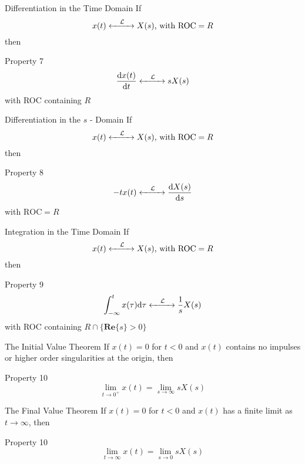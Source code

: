 \documentclass[aspectratio=169]{beamer}
\begin{document}
\begin{frame}{Differentiation in the Time Domain}
If\\
\[x(t) \xleftrightarrow[]{\quad\mathcal{L}\quad} X(s) \text{, with } \mathrm{ROC} =R\]
then
\begin{block}{Property 7}
	\[ \frac{\mathrm{d}x(t)}{\mathrm{d}t} \xleftrightarrow[]{\quad\mathcal{L}\quad} sX(s) \]
	\centering
	with ROC containing $ R $
\end{block}
\end{frame}

\begin{frame}{Differentiation in the $ s $ - Domain}
If\\
\[x(t) \xleftrightarrow[]{\quad\mathcal{L}\quad} X(s) \text{, with } \mathrm{ROC} =R\]
then
\begin{block}{Property 8}
	\[ -tx(t) \xleftrightarrow[]{\quad\mathcal{L}\quad} \frac{\mathrm{d}X(s)}{\mathrm{d}s} \]
	\centering
	with $\mathrm{ROC} = R $
\end{block}
\end{frame}

\begin{frame}{Integration in the Time Domain}
If\\
\[x(t) \xleftrightarrow[]{\quad\mathcal{L}\quad} X(s) \text{, with } \mathrm{ROC} =R\]
then
\begin{block}{Property 9}
	\[ \int_{-\infty}^{t}x(\tau)\mathrm{d}\tau \xleftrightarrow[]{\quad\mathcal{L}\quad} \frac{1}{s}X(s) \]
	\centering
	with ROC containing $ R\cap\{\mathbf{Re}\{s\}>0\} $
\end{block}
\end{frame}

\begin{frame}{The Initial Value Theorem}
If $ x(t) = 0 $ for $ t<0 $ and $ x(t) $ contains no impulses or higher order singularities at the origin, then 
\begin{block}{Property 10}
	\[\lim\limits_{t\to 0^+}x(t) = \lim\limits_{s\to\infty}sX(s)\]
\end{block}
\end{frame}

\begin{frame}{The Final Value Theorem}
If $ x(t) = 0 $ for $ t<0 $ and $ x(t) $ has a finite limit as $ t\to \infty $, then 
\begin{block}{Property 10}
	\[\lim\limits_{t\to \infty}x(t) = \lim\limits_{s\to0}sX(s)\]
\end{block}

\end{frame}
\end{document}
